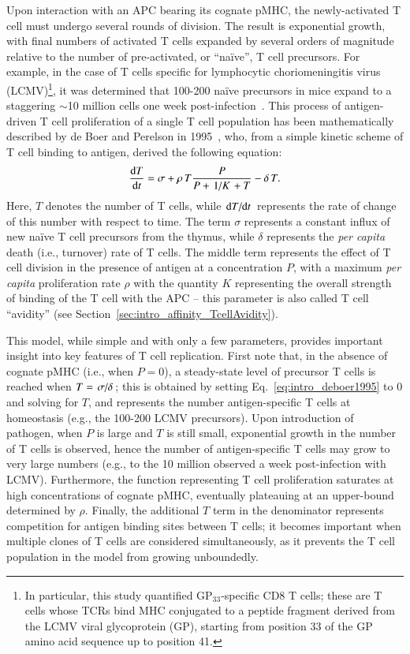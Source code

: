 Upon interaction with an APC bearing its cognate pMHC, the newly-activated T cell must undergo several rounds of division. The result is exponential growth, with final numbers of activated T cells expanded by several orders of magnitude relative to the number of pre-activated, or ``na\"{i}ve'', T cell precursors. For example, in the case of T cells specific for lymphocytic choriomeningitis virus (LCMV)\footnote{In particular, this study quantified GP$_{33}$-specific CD8\pos{} T cells; these are T cells whose TCRs bind MHC conjugated to a peptide fragment derived from the LCMV viral glycoprotein (GP), starting from position 33 of the GP amino acid sequence up to position 41.}, it was determined that 100-200 na\"{i}ve precursors in mice expand to a staggering $\sim$10 million cells one week post-infection~\cite{blattman2002estimating}. This process of antigen-driven T cell proliferation of a single T cell population has been mathematically described by de Boer and Perelson in 1995~\cite{de1995towards}, who, from a simple kinetic scheme of T cell binding to antigen, derived the following equation:
%
\begin{equation}
    \dv{T}{t} = \sigma + \rho \, T \frac{P}{P + \flatfrac{1}{K} + T} - \delta \, T.
    \label{eq:intro_deboer1995}
\end{equation}
%
Here, $T$ denotes the number of T cells, while $\dv*{T}{t}$ represents the rate of change of this number with respect to time. The term $\sigma$ represents a constant influx of new na\"{i}ve T cell precursors from the thymus, while $\delta$ represents the \textit{per capita} death (i.e., turnover) rate of T cells. The middle term represents the effect of T cell division in the presence of antigen at a concentration $P$, with a maximum \textit{per capita} proliferation rate $\rho$ with the quantity $K$ representing the overall strength of binding of the T cell with the APC -- this parameter is also called T cell ``avidity'' (see Section~\ref{sec:intro_affinity_TcellAvidity}).

This model, while simple and with only a few parameters, provides important insight into key features of T cell replication. First note that, in the absence of cognate pMHC (i.e., when $P=0$), a steady-state level of precursor T cells is reached when $T = \flatfrac{\sigma}{\delta}$; this is obtained by setting Eq.~\eqref{eq:intro_deboer1995} to 0 and solving for $T$, and represents the number antigen-specific T cells at homeostasis (e.g., the 100-200 LCMV precursors). Upon introduction of pathogen, when $P$ is large and $T$ is still small, exponential growth in the number of T cells is observed, hence the number of antigen-specific T cells may grow to very large numbers (e.g., to the 10 million observed a week post-infection with LCMV). Furthermore, the function representing T cell proliferation saturates at high concentrations of cognate pMHC, eventually plateauing at an upper-bound determined by $\rho$. Finally, the additional $T$ term in the denominator represents competition for antigen binding sites between T cells; it becomes important when multiple clones of T cells are considered simultaneously, as it prevents the T cell population in the model from growing unboundedly.

